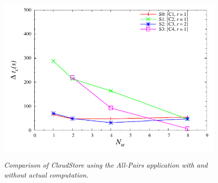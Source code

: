\documentclass{rspublic}
\newcommand{\micnote}[1]{ {\textcolor{blue} { ***Michael: #1 }}}
\newcommand{\betynote}[1]{ {\textcolor{orange} { ***Bety: #1 }}}
\newcommand{\jhanote}[1]{} \newcommand{\micnote}[1]{}\newcommand{\betynote}[1]{} \newcommand{\fixme}[1]{}
\begin{document}
\begin{center}
\begin{figure}
{\includegraphics[scale=0.5]{data/graphs/CloudStoreComputeMinusNoCompute144}
\label{Fig:experiment4:c}
}
\caption{\textit{Comparison of CloudStore using the All-Pairs
    application with and without actual computation.} \jhanote{the
    labels need to be fixed, i.e. remove long descriptions}}
\label{Fig:experiment4}
\end{figure}
\end{center}
\end{document}
